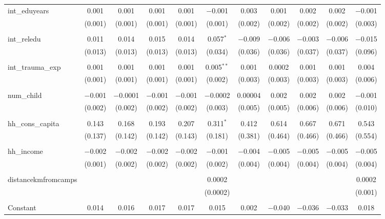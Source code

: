 \begin{table}[H]
\begin{tabular}{@{\extracolsep{4pt}}lcccccccccc}
 int\_eduyears & 0.001 & 0.001 & 0.001 & 0.001 & $-$0.001 & 0.003 & 0.001 & 0.002 & 0.002 & $-$0.001 \\ 
  & (0.001) & (0.001) & (0.001) & (0.001) & (0.001) & (0.002) & (0.002) & (0.002) & (0.002) & (0.003) \\ 
  & & & & & & & & & & \\ 
 int\_reledu & 0.011 & 0.014 & 0.015 & 0.014 & 0.057$^{*}$ & $-$0.009 & $-$0.006 & $-$0.003 & $-$0.006 & $-$0.015 \\ 
  & (0.013) & (0.013) & (0.013) & (0.013) & (0.034) & (0.036) & (0.036) & (0.037) & (0.037) & (0.096) \\ 
  & & & & & & & & & & \\ 
 int\_trauma\_exp & 0.001 & 0.001 & 0.001 & 0.001 & 0.005$^{**}$ & 0.001 & 0.0002 & 0.001 & 0.001 & 0.004 \\ 
  & (0.001) & (0.001) & (0.001) & (0.001) & (0.002) & (0.003) & (0.003) & (0.003) & (0.003) & (0.006) \\ 
  & & & & & & & & & & \\ 
 num\_child & $-$0.001 & $-$0.0001 & $-$0.001 & $-$0.001 & $-$0.0002 & 0.00004 & 0.002 & 0.002 & 0.002 & $-$0.001 \\ 
  & (0.002) & (0.002) & (0.002) & (0.002) & (0.003) & (0.005) & (0.005) & (0.006) & (0.006) & (0.010) \\ 
  & & & & & & & & & & \\ 
 hh\_cons\_capita & 0.143 & 0.168 & 0.193 & 0.207 & 0.311$^{*}$ & 0.412 & 0.614 & 0.667 & 0.671 & 0.543 \\ 
  & (0.137) & (0.142) & (0.142) & (0.143) & (0.181) & (0.381) & (0.464) & (0.466) & (0.466) & (0.554) \\ 
  & & & & & & & & & & \\ 
 hh\_income & $-$0.002 & $-$0.002 & $-$0.002 & $-$0.002 & $-$0.001 & $-$0.004 & $-$0.005 & $-$0.005 & $-$0.005 & $-$0.005 \\ 
  & (0.001) & (0.002) & (0.002) & (0.002) & (0.002) & (0.004) & (0.004) & (0.004) & (0.004) & (0.004) \\ 
  & & & & & & & & & & \\ 
 distancekmfromcamps &  &  &  &  & 0.0002 &  &  &  &  & 0.0002 \\ 
  &  &  &  &  & (0.0002) &  &  &  &  & (0.001) \\ 
  & & & & & & & & & & \\ 
 Constant & 0.014 & 0.016 & 0.017 & 0.017 & 0.015 & 0.002 & $-$0.040 & $-$0.036 & $-$0.033 & 0.018 \\ 

\end{tabular}
\end{table}
